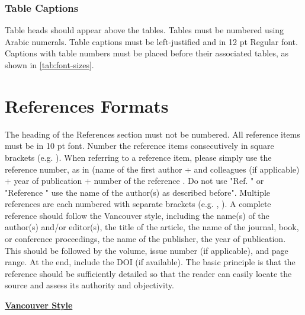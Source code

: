 \documentclass{siintec}
\begin{document}
\subsubsection{Table Captions}
Table heads should appear above the tables. Tables must be numbered using Arabic numerals. Table captions must be left-justified and in 12 pt Regular font. Captions with table numbers must be placed before their associated tables, as shown in \autoref{tab:font-sizes}.


\section{References Formats}
The heading of the References section must not be numbered. All reference items must be in 10 pt font. Number the reference items consecutively in square brackets (e.g. \cite{fogg2003}). When referring to a reference item, please simply use the reference number, as in (name of the first author + and colleagues (if applicable) + year of publication + number of the reference \cite{hirsh2002}.  Do not use "Ref. \cite{eckes2000}" or "Reference \cite{eckes2000}" use the name of the author(s) as described before".  Multiple references are each numbered with separate brackets (e.g. \cite{fogg2003}, \cite{hirsh2002,eckes2000}).
A complete reference should follow the Vancouver style, including the name(s) of the author(s) and/or editor(s), the title of the article, the name of the journal, book, or conference proceedings, the name of the publisher, the year of publication. This should be followed by the volume, issue number (if applicable), and page range. At the end, include the DOI (if available).
The basic principle is that the reference should be sufficiently detailed so that the reader can easily locate the source and assess its authority and objectivity.

\textbf{\underline{Vancouver Style}}
\end{document}
